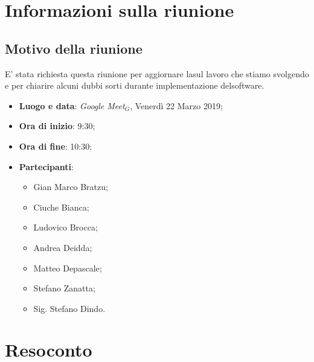 \documentclass[a4paper,12pt]{article}
\begin{document}
	\section{Informazioni sulla riunione}
	\subsection{Motivo della riunione}E' stata richiesta questa riunione per aggiornare lasul lavoro che stiamo svolgendo e per chiarire alcuni dubbi sorti durante implementazione delsoftware.
	
	\begin{itemize}
		\item \textbf{Luogo e data}: \textit{Google Meet$_{G}$}, Venerdì 22 Marzo 2019;
		\item \textbf{Ora di inizio}: 9:30;
		\item \textbf{Ora di fine}: 10:30;
		\item \textbf{Partecipanti}:  
		\begin{itemize}
			\item Gian Marco Bratzu;
			\item Ciuche Bianca;
			\item Ludovico Brocca;
			\item Andrea Deidda;
			\item Matteo Depascale;
			\item Stefano Zanatta;
			\item Sig. Stefano Dindo.
		\end{itemize}
	\end{itemize}
	
	\section{Resoconto}
\end{document}
